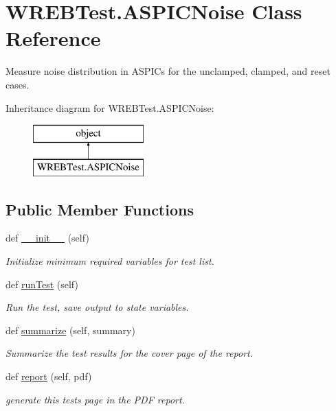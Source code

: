 \hypertarget{class_w_r_e_b_test_1_1_a_s_p_i_c_noise}{}\section{W\+R\+E\+B\+Test.\+A\+S\+P\+I\+C\+Noise Class Reference}
\label{class_w_r_e_b_test_1_1_a_s_p_i_c_noise}


Measure noise distribution in A\+S\+P\+I\+Cs for the unclamped, clamped, and reset cases.  


Inheritance diagram for W\+R\+E\+B\+Test.\+A\+S\+P\+I\+C\+Noise\+:\begin{figure}[H]
\begin{center}
\leavevmode
\includegraphics[height=2.000000cm]{class_w_r_e_b_test_1_1_a_s_p_i_c_noise}
\end{center}
\end{figure}
\subsection*{Public Member Functions}
\begin{DoxyCompactItemize}
\item 
def \hyperlink{class_w_r_e_b_test_1_1_a_s_p_i_c_noise_aeba1015afa34a9e7a910cea0f29e8c3d}{\+\_\+\+\_\+init\+\_\+\+\_\+} (self)
\begin{DoxyCompactList}\small\item\em Initialize minimum required variables for test list. \end{DoxyCompactList}\item 
def \hyperlink{class_w_r_e_b_test_1_1_a_s_p_i_c_noise_a19e29e14fffdf4e68138cbdfcc163239}{run\+Test} (self)
\begin{DoxyCompactList}\small\item\em Run the test, save output to state variables. \end{DoxyCompactList}\item 
def \hyperlink{class_w_r_e_b_test_1_1_a_s_p_i_c_noise_ad62fb0b9da2f0ce945d87c39bc6b21ec}{summarize} (self, summary)
\begin{DoxyCompactList}\small\item\em Summarize the test results for the cover page of the report. \end{DoxyCompactList}\item 
def \hyperlink{class_w_r_e_b_test_1_1_a_s_p_i_c_noise_afd7290484d947bfc92799c868ab27d98}{report} (self, pdf)
\begin{DoxyCompactList}\small\item\em generate this test\textquotesingle{}s page in the P\+DF report. \end{DoxyCompactList}\end{DoxyCompactItemize}


